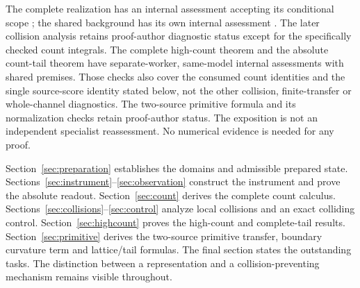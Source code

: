 The complete realization \cite{TNDDirect} has an internal assessment
accepting its conditional scope \cite{TNDDirectReview}; the shared background
has its own internal assessment \cite{TNDSharedReview}. The later collision analysis \cite{TNDDirectCollision} retains
proof-author diagnostic status except for the specifically checked count
integrals. The complete high-count theorem \cite{TNDHighCount} and the
absolute count-tail theorem \cite{TNDCountTail} have separate-worker,
same-model internal assessments \cite{TNDHighCountReview,TNDCountTailReview}
with shared premises. Those checks also cover the consumed count identities
and the single source-score identity stated below, not the other collision,
finite-transfer or whole-channel diagnostics. The two-source primitive
formula \cite{TNDPrimitiveLattice} and its normalization checks retain
proof-author status. The exposition is not an
independent specialist reassessment. No numerical evidence is needed for
any proof.

Section~\ref{sec:preparation} establishes the domains and admissible prepared
state. Sections~\ref{sec:instrument}--\ref{sec:observation} construct the
instrument and prove the absolute readout. Section~\ref{sec:count} derives
the complete count calculus. Sections~\ref{sec:collisions}--\ref{sec:control}
analyze local collisions and an exact colliding control.
Section~\ref{sec:highcount} proves the high-count and complete-tail results.
Section~\ref{sec:primitive} derives the two-source primitive transfer,
boundary curvature term and lattice/tail formulas.
The final section states the outstanding tasks. The distinction between a representation and
a collision-preventing mechanism remains visible throughout.
